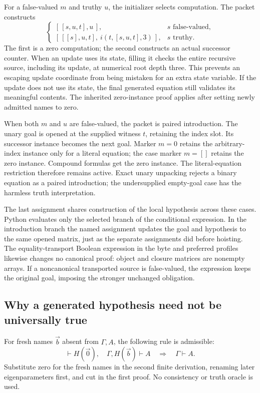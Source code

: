 \documentclass[11pt,letterpaper]{article}
\theoremstyle{definition}\newtheorem{definition}[theorem]{Definition}
\theoremstyle{remark}\newtheorem{remark}[theorem]{Remark}
\begin{document}
For a false-valued $m$ and truthy $u$, the initializer selects
computation. The packet constructs
\[
 \begin{cases}
 [\,[s,u,t],u\,], &s\text{ false-valued},\\
 [\,[[s],u,t],\ i(t,[s,u,t],3)\,], &s\text{ truthy}.
 \end{cases}
\]
The first is a zero computation; the second constructs an actual
successor counter. When an update uses its state, filling it checks the
entire recursive source, including its update, at numerical root depth
three. This prevents an escaping update coordinate from being mistaken
for an extra state variable. If the update does not use its state,
the final generated equation still validates its meaningful contents.
The inherited zero-instance proof applies after setting newly admitted
names to zero.

When both $m$ and $u$ are false-valued, the packet is paired introduction.
The unary goal is opened at the supplied witness $t$, retaining the
index slot. Its successor instance becomes the next goal. Marker
$m=0$ retains the arbitrary-index instance only for a literal equation;
the case marker $m=[]$ retains the zero instance. Compound formulas get
the zero instance. The literal-equation restriction therefore remains
active. Exact unary unpacking rejects a binary equation as a paired
introduction; the undersupplied empty-goal case has the harmless truth
interpretation.

The last assignment shares construction of the local hypothesis across
these cases. Python evaluates only the selected branch of the conditional
expression. In the introduction branch the named assignment updates
the goal and hypothesis to the same opened matrix, just as the separate
assignments did before hoisting. The equality-transport Boolean
expression in the byte and preferred profiles likewise changes no
canonical proof: object and closure matrices are nonempty arrays. If
a noncanonical transported source is false-valued, the expression keeps
the original goal, imposing the stronger unchanged obligation.

\subsection{Why a generated hypothesis need not be universally true}

For fresh names $\vec b$ absent from $\Gamma,A$, the following rule is
admissible:
\[
 \vdash H(\vec0),\quad \Gamma,H(\vec b)\vdash A
 \quad\Longrightarrow\quad\Gamma\vdash A.
\]
Substitute zero for the fresh names in the second finite derivation,
renaming later eigenparameters first, and cut in the first proof.
No consistency or truth oracle is used.
\end{document}
